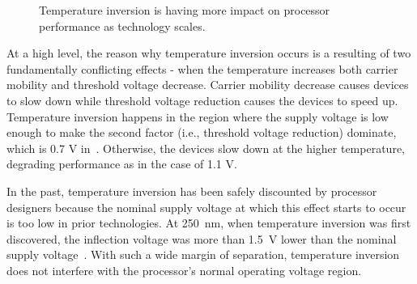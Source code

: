 \begin{figure}[t!]
\captionsetup[subfloat]{width=0.4\textwidth}
\centering 
{}
\hspace{0.4in}
\caption{Temperature inversion is having more impact on processor performance as technology scales.}
\label{fig:motivation-plots}
\vspace{-0.2in}
\end{figure}

At a high level, the reason why temperature inversion occurs is a resulting of two fundamentally conflicting effects - when the temperature increases both carrier mobility and threshold voltage decrease. Carrier mobility decrease causes devices to slow down while threshold voltage reduction causes the devices to speed up. Temperature inversion happens in the region where the supply voltage is low enough to make the second factor (i.e., threshold voltage reduction) dominate, which is 0.7 V in~. Otherwise, the devices slow down at the higher temperature, degrading performance as in the case of 1.1 V. 

In the past, temperature inversion has been safely discounted by processor designers because the nominal supply voltage at which this effect starts to occur is too low in prior technologies. At 250~nm, when temperature inversion was first discovered, the inflection voltage was more than 1.5~V lower than the nominal supply voltage~\cite{park1995reversal,bellaouar1998supply,dasdan2006handling}. With such a wide margin of separation, temperature inversion does not interfere with the processor's normal operating voltage region.

